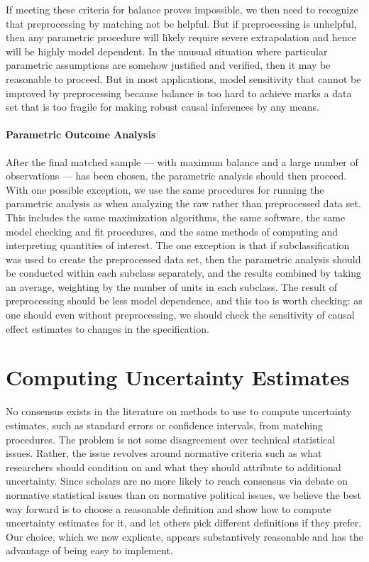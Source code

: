\documentclass[11pt,titlepage]{article}
\begin{document}
If meeting these criteria for balance proves impossible, we then need
to recognize that preprocessing by matching not be helpful.  But if
preprocessing is unhelpful, then any parametric procedure will likely
require severe extrapolation and hence will be highly model dependent.
In the unusual situation where particular parametric assumptions are
somehow justified and verified, then it may be reasonable to proceed.
But in most applications, model sensitivity that cannot be improved by
preprocessing because balance is too hard to achieve marks a data set
that is too fragile for making robust causal inferences by any means.

\paragraph{Parametric Outcome Analysis}  
After the final matched sample --- with maximum balance and a large
number of observations --- has been chosen, the parametric analysis
should then proceed.  With one possible exception, we use the same
procedures for running the parametric analysis as when analyzing the
raw rather than preprocessed data set.  This includes the same
maximization algorithms, the same software, the same model checking
and fit procedures, and the same methods of computing and interpreting
quantities of interest.  The one exception is that if
subclassification was used to create the preprocessed data set, then
the parametric analysis should be conducted within each subclass
separately, and the results combined by taking an average, weighting
by the number of units in each subclass.  The result of preprocessing
should be less model dependence, and this too is worth checking: as
one should even without preprocessing, we should check the sensitivity of causal
effect estimates to changes in the specification.

\section{Computing Uncertainty Estimates}

No consensus exists in the literature on methods to use to compute
uncertainty estimates, such as standard errors or confidence
intervals, from matching procedures.  The problem is not some
disagreement over technical statistical issues.  Rather, the issue
revolves around normative criteria such as what researchers should
condition on and what they should attribute to additional uncertainty.
Since scholars are no more likely to reach consensus via debate on
normative statistical issues than on normative political issues, we
believe the best way forward is to choose a reasonable definition and
show how to compute uncertainty estimates for it, and let others pick
different definitions if they prefer.  Our choice, which we now
explicate, appears substantively reasonable and has the advantage of
being easy to implement.
\end{document}
